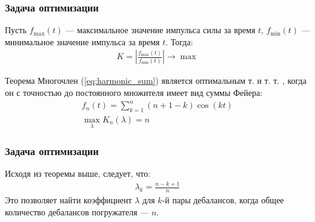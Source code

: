 \documentclass[10pt, pdf, hyperref={unicode}]{beamer}
\begin{document}
    \begin{frame}
        \frametitle{Задача оптимизации}
        \begin{center}
            \begin{minipage}[h]{0.97\linewidth}
                Пусть $f_{\max}(t)$ --- максимальное значение импульса силы за время $t$, $f_{\min}(t)$ --- минимальное значение импульса за время $t$. Тогда:
                \begin{equation}
                    \begin{gathered}
                        K = \left| \frac{f_{\max}(t)}{f_{\min}(t)} \right| \rightarrow \max
                    \end{gathered}
                \end{equation}
                \begin{block}{Теорема\footnotemark[3]}\label{teorema}
                    Многочлен (\ref{eq:harmonic_sum}) является оптимальным т. и т. т. , когда он с точностью до постоянного множителя имеет вид суммы Фейера:
                    \begin{equation}\label{eq:feer}
                        \begin{gathered}
                            f_n(t) = \sum\limits_{k = 1}^n (n + 1 - k) \cos(kt)\\
                            \max \limits_{\lambda} K_n(\lambda) = n
                        \end{gathered}
                    \end{equation}
                \end{block}
            \end{minipage}
        \end{center}
    \end{frame}

    \begin{frame}
        \frametitle{Задача оптимизации}
        \begin{center}
            \begin{minipage}[h]{0.97\linewidth}
                Исходя из теоремы выше, следует, что:
                \begin{equation}
                    \begin{gathered}
                        \lambda_k = \frac{n - k + 1}{n}
                    \end{gathered}
                \end{equation}
                Это позволяет найти коэффициент $\lambda$ для $k$-й пары дебалансов, когда общее количество дебалансов погружателя --- $n$.
            \end{minipage}
        \end{center}
    \end{frame}
\end{document}
